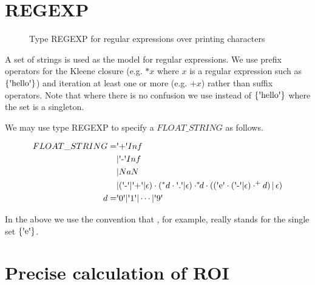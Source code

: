 \documentclass[runningheads,12pt]{article}
\begin{document}




\appendix

\section{REGEXP}

\begin{figure}

\caption{Type REGEXP for regular expressions over printing characters}
\end{figure}

A set of strings is used as the model for regular expressions. We use prefix operators for the Kleene closure (e.g. $*x$ where $x$ is a regular expression such as $\{\squote{hello}\}$) and iteration at least one or more (e.g. $\textrm{+}x$) rather than suffix operators. Note that where there is no confusion we use  instead of $\{\squote{hello}\}$ where the set is a singleton. 

We may use type REGEXP to specify a $FLOAT\_STRING$ as follows.

\begin{align}
FLOAT\_STRING = &\squote{+}Inf\\
&|\squote{-}Inf\\
&|NaN\\
&|(\squote{-}|\squote{+}|\epsilon)\cdot(^*d\cdot\squote{.}|\epsilon)\cdot
	^*\!\!d\cdot ((\squote{e}\cdot(\squote{-}|\epsilon)\cdot^\textrm{+}d)\,|\,\epsilon)\\
d = &\squote{0} | \squote{1} | \cdots |\squote{9} 
\end{align}

In the above we use the convention that , for example, really stands for the single set $\{\squote{e}\}$.



\section{Precise calculation of ROI}
\end{document}
